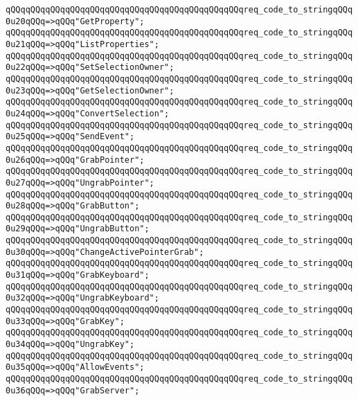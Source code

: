 \verb|qQQqqQQqqQQqqQQqqQQqqQQqqQQqqQQqqQQqqQQqqQQqqQQqreq_code_to_stringqQQq0u20qQQq=>qQQq"GetProperty";|\newline
\verb|qQQqqQQqqQQqqQQqqQQqqQQqqQQqqQQqqQQqqQQqqQQqqQQqreq_code_to_stringqQQq0u21qQQq=>qQQq"ListProperties";|\newline
\verb|qQQqqQQqqQQqqQQqqQQqqQQqqQQqqQQqqQQqqQQqqQQqqQQqreq_code_to_stringqQQq0u22qQQq=>qQQq"SetSelectionOwner";|\newline
\verb|qQQqqQQqqQQqqQQqqQQqqQQqqQQqqQQqqQQqqQQqqQQqqQQqreq_code_to_stringqQQq0u23qQQq=>qQQq"GetSelectionOwner";|\newline
\verb|qQQqqQQqqQQqqQQqqQQqqQQqqQQqqQQqqQQqqQQqqQQqqQQqreq_code_to_stringqQQq0u24qQQq=>qQQq"ConvertSelection";|\newline
\verb|qQQqqQQqqQQqqQQqqQQqqQQqqQQqqQQqqQQqqQQqqQQqqQQqreq_code_to_stringqQQq0u25qQQq=>qQQq"SendEvent";|\newline
\verb|qQQqqQQqqQQqqQQqqQQqqQQqqQQqqQQqqQQqqQQqqQQqqQQqreq_code_to_stringqQQq0u26qQQq=>qQQq"GrabPointer";|\newline
\verb|qQQqqQQqqQQqqQQqqQQqqQQqqQQqqQQqqQQqqQQqqQQqqQQqreq_code_to_stringqQQq0u27qQQq=>qQQq"UngrabPointer";|\newline
\verb|qQQqqQQqqQQqqQQqqQQqqQQqqQQqqQQqqQQqqQQqqQQqqQQqreq_code_to_stringqQQq0u28qQQq=>qQQq"GrabButton";|\newline
\verb|qQQqqQQqqQQqqQQqqQQqqQQqqQQqqQQqqQQqqQQqqQQqqQQqreq_code_to_stringqQQq0u29qQQq=>qQQq"UngrabButton";|\newline
\verb|qQQqqQQqqQQqqQQqqQQqqQQqqQQqqQQqqQQqqQQqqQQqqQQqreq_code_to_stringqQQq0u30qQQq=>qQQq"ChangeActivePointerGrab";|\newline
\verb|qQQqqQQqqQQqqQQqqQQqqQQqqQQqqQQqqQQqqQQqqQQqqQQqreq_code_to_stringqQQq0u31qQQq=>qQQq"GrabKeyboard";|\newline
\verb|qQQqqQQqqQQqqQQqqQQqqQQqqQQqqQQqqQQqqQQqqQQqqQQqreq_code_to_stringqQQq0u32qQQq=>qQQq"UngrabKeyboard";|\newline
\verb|qQQqqQQqqQQqqQQqqQQqqQQqqQQqqQQqqQQqqQQqqQQqqQQqreq_code_to_stringqQQq0u33qQQq=>qQQq"GrabKey";|\newline
\verb|qQQqqQQqqQQqqQQqqQQqqQQqqQQqqQQqqQQqqQQqqQQqqQQqreq_code_to_stringqQQq0u34qQQq=>qQQq"UngrabKey";|\newline
\verb|qQQqqQQqqQQqqQQqqQQqqQQqqQQqqQQqqQQqqQQqqQQqqQQqreq_code_to_stringqQQq0u35qQQq=>qQQq"AllowEvents";|\newline
\verb|qQQqqQQqqQQqqQQqqQQqqQQqqQQqqQQqqQQqqQQqqQQqqQQqreq_code_to_stringqQQq0u36qQQq=>qQQq"GrabServer";|\newline
